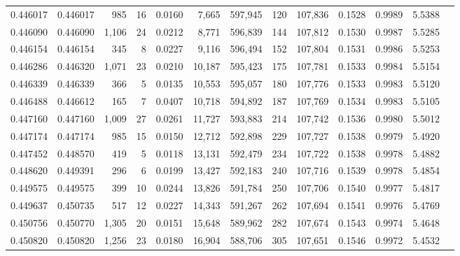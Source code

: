 \begin{tabular}{rrrrrrrrrrrrr}
0.446017 & 0.446017 &   985 &    16 &                                     0.0160 &   7,665 & 597,945 &     120 & 107,836 & 0.1528 & 0.9989 & 5.5388 \\
0.446090 & 0.446090 & 1,106 &    24 &                                     0.0212 &   8,771 & 596,839 &     144 & 107,812 & 0.1530 & 0.9987 & 5.5285 \\
0.446154 & 0.446154 &   345 &     8 &                                     0.0227 &   9,116 & 596,494 &     152 & 107,804 & 0.1531 & 0.9986 & 5.5253 \\
0.446286 & 0.446320 & 1,071 &    23 &                                     0.0210 &  10,187 & 595,423 &     175 & 107,781 & 0.1533 & 0.9984 & 5.5154 \\
0.446339 & 0.446339 &   366 &     5 &                                     0.0135 &  10,553 & 595,057 &     180 & 107,776 & 0.1533 & 0.9983 & 5.5120 \\
0.446488 & 0.446612 &   165 &     7 &                                     0.0407 &  10,718 & 594,892 &     187 & 107,769 & 0.1534 & 0.9983 & 5.5105 \\
0.447160 & 0.447160 & 1,009 &    27 &                                     0.0261 &  11,727 & 593,883 &     214 & 107,742 & 0.1536 & 0.9980 & 5.5012 \\
0.447174 & 0.447174 &   985 &    15 &                                     0.0150 &  12,712 & 592,898 &     229 & 107,727 & 0.1538 & 0.9979 & 5.4920 \\
0.447452 & 0.448570 &   419 &     5 &                                     0.0118 &  13,131 & 592,479 &     234 & 107,722 & 0.1538 & 0.9978 & 5.4882 \\
0.448620 & 0.449391 &   296 &     6 &                                     0.0199 &  13,427 & 592,183 &     240 & 107,716 & 0.1539 & 0.9978 & 5.4854 \\
0.449575 & 0.449575 &   399 &    10 &                                     0.0244 &  13,826 & 591,784 &     250 & 107,706 & 0.1540 & 0.9977 & 5.4817 \\
0.449637 & 0.450735 &   517 &    12 &                                     0.0227 &  14,343 & 591,267 &     262 & 107,694 & 0.1541 & 0.9976 & 5.4769 \\
0.450756 & 0.450770 & 1,305 &    20 &                                     0.0151 &  15,648 & 589,962 &     282 & 107,674 & 0.1543 & 0.9974 & 5.4648 \\
0.450820 & 0.450820 & 1,256 &    23 &                                     0.0180 &  16,904 & 588,706 &     305 & 107,651 & 0.1546 & 0.9972 & 5.4532 \\

\end{tabular}
